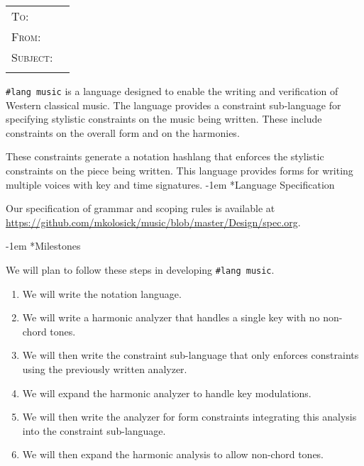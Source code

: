 \documentclass{article}
\makeatletter
\newcommand{\makeheader}{%
  \noindent
  \begin{tabular}{@{}ll}
    \ifdefined\@recipient
      \textsc{To: } & \@recipient{} \\
    \fi
    \ifdefined\@from
      \textsc{From: } & \@from{} \\
    \fi
    \ifdefined\@subject
      \textsc{Subject: } & \@subject{} \\
    \fi
  \end{tabular}
  \vspace{1\baselineskip}
}
\renewcommand\section{\@startsection {section}{1}{\z@}%
    {\z@}
    {-1em}%
    {\itshape}}
\newcommand{\music}{\texttt{\#lang music}}
\makeatother
\begin{document}
\makeheader{}

\music{} is a language designed to enable the writing and verification of Western
classical music. The language provides a constraint sub-language for specifying
stylistic constraints on the music being written. These include constraints on
the overall form and on the harmonies.

These constraints generate a notation hashlang that enforces the stylistic
constraints on the piece being written. This language provides forms for writing
multiple voices with key and time signatures.
\section*{Language Specification}

Our specification of grammar and scoping rules is available at
\url{https://github.com/mkolosick/music/blob/master/Design/spec.org}.

\section*{Milestones}

We will plan to follow these steps in developing \music{}.
\begin{enumerate}
  \item We will write the notation language.
  \item We will write a harmonic analyzer that handles a single key with no
    non-chord tones.
  \item We will then write the constraint sub-language that only enforces
    constraints using the previously written analyzer.
  \item We will expand the harmonic analyzer to handle key modulations.
  \item We will then write the analyzer for form constraints integrating this
    analysis into the constraint sub-language.
  \item We will then expand the harmonic analysis to allow non-chord tones.
\end{enumerate}
\end{document}
